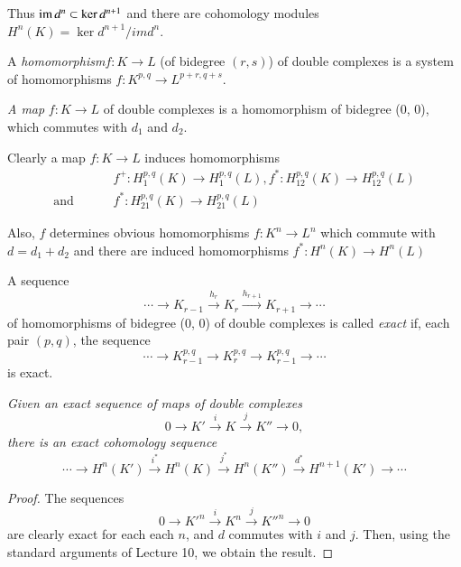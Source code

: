  Thus $ \operatorname{im} d^n \subset \ker d^{n+1} $ and there are  cohomology
 modules $H^n (K) = \ker d^{n+1} / im d^n $. 

\begin{defi*}%
A {\em homomorphism}\pageoriginale $f: K \rightarrow L$ (of bidegree
$(r,s)$) of double complexes is a system of homomorphisms $f : K^{p,q}
\rightarrow L^{p+r , q+s}$. 
\end{defi*}

\begin{defi*}%
{\em A map} $f : K \rightarrow L$ of double complexes is a
homomorphism of bidegree (0, 0), which commutes with $d_1$ and
$d_2$. 
\end{defi*}

Clearly a map $f : K \rightarrow L$ induces homomorphisms
\begin{align*}
& f^+ : H^{p,q}_1 (K) \rightarrow H^{p,q}_1 (L),  f^* : H^{p,q}_{12} (K) 
\rightarrow H^{p,q}_{12} (L)\\
\text{and } \qquad & f^* : H^{p,q}_{21} (K) \rightarrow
H^{p,q}_{21} (L) 
\end{align*}

Also, $f$ determines obvious homomorphisms $f : K^n \rightarrow L^n$
which commute with $d = d_1 + d_2$ and there are induced homomorphisms
$f^* : H^n (K) \rightarrow H^n(L)$ 

\begin{defi*} %
A sequence
$$
\cdots \rightarrow K_{r-1} \xrightarrow{h_r} K_r \xrightarrow{h_{r+1}}
K_{r+1}\rightarrow \cdots 
$$
of homomorphisms of bidegree (0, 0) of double complexes is called {\em
  exact} if, each pair $(p, q)$, the sequence 
$$
\cdots \rightarrow K^{p,q}_{r-1} \rightarrow K^{p,q}_r \rightarrow
K^{p,q}_{r-1} \rightarrow \cdots 
$$
is exact. 
\end{defi*}

\textit{Given an exact sequence of maps of double complexes}  
$$
0 \rightarrow K' \xrightarrow{i} K \xrightarrow{j} K'' \rightarrow 0,  
$$
\textit{there is an exact cohomology sequence}  
$$
\cdots \rightarrow H^n(K') \xrightarrow{i^\ast} H^n(K) \xrightarrow{j^\ast} 
H^n(K'') \xrightarrow{d^\ast} H^{n+1}(K') \rightarrow \cdots 
$$  

\begin{proof}
The sequences\pageoriginale
$$
0 \rightarrow K'^n \xrightarrow{i} K^n \xrightarrow{j} K''^n
\rightarrow 0 
$$
are clearly exact for each each $n$, and $d$ commutes with $i$ and 
$j$. Then, using the standard arguments of Lecture 10, we obtain the
result. 
\end{proof}

